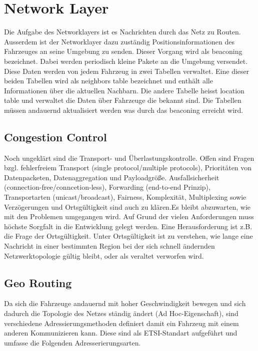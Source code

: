 \chapter{Network Layer\label{chap:networklayer}}
Die Aufgabe des Networklayers ist es Nachrichten durch das Netz zu Routen. Ausserdem ist der Networklayer dazu zuständig Positionsinformationen des Fahrzeuges an seine Umgebung zu senden. Dieser Vorgang wird als beaconing bezeichnet. Dabei werden periodisch kleine Pakete an die Umgebung versendet. Diese Daten werden von jedem Fahrzeug in zwei Tabellen verwaltet. Eine dieser beiden Tabellen wird als neighbors table bezeichnet und enthält alle Informationen über die aktuellen Nachbarn. Die andere Tabelle heisst location table und verwaltet die Daten über Fahrzeuge die bekannt sind. Die Tabellen müssen andauernd aktualisiert werden was durch das beaconing erreicht wird.

\section{Congestion Control\label{sec:congestioncontrol}}
Noch ungeklärt sind die Transport- und Überlastungskontrolle. Offen sind Fragen bzgl. fehlerfreiem Transport (single protocol/multiple protocols), Prioritäten von Datenpacketen, Datenaggregation und Payloadgröße. Ausfallsicherheit (connection-free/conncetion-less), Forwarding (end-to-end Prinzip), Transportarten (unicast/broadcast), Fairness, Komplexität, Multiplexing sowie Verzögerungen und Ortsgültigkeit sind auch zu klären.Es bleibt abzuwarten, wie mit den Problemen umgegangen wird. Auf Grund der vielen Anforderungen muss höchste Sorgfalt in die Entwicklung gelegt werden. Eine Herausforderung ist z.B. die Frage der Ortsgültigkeit. Unter Ortsgültigkeit ist zu verstehen, wie lange eine Nachricht in einer bestimmten Region bei der sich schnell ändernden Netzwerktopologie gültig bleibt, oder als veraltet verworfen wird.

\section{Geo Routing\label{sec:georouting}}
Da sich die Fahrzeuge andauernd mit hoher Geschwindigkeit bewegen und sich dadurch die Topologie des Netzes ständig ändert (Ad Hoc-Eigenschaft), sind verschiedene Adressierungsmethoden definiert damit ein Fahrzeug mit einem anderen Kommunizieren kann. Diese sind als ETSI-Standart aufgeführt und umfasse die Folgenden Adresserierungsarten. 

